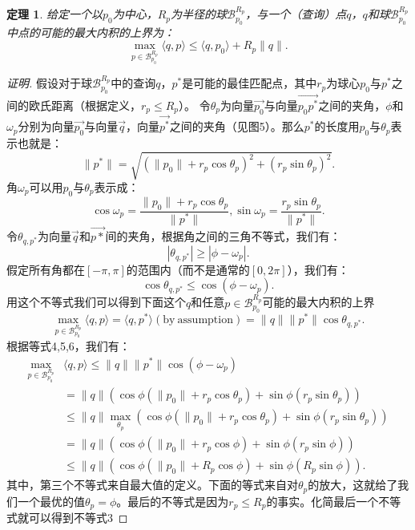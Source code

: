 \documentclass[twocolumn]{article}
\begin{document}
\newtheorem{theorem1}{定理}[section]
\begin{theorem1}
给定一个以$p_0$为中心，$R_p$为半径的球$\mathcal{B}_{p_0}^{R_p}$，与一个（查询）点$q$，$q$和球$\mathcal{B}_{p_0}^{R_p}$中点的可能的最大内积的上界为：
\begin{equation}
\max_{p \in \mathcal{B}_{p_0}^{R_p}} \langle q,p \rangle \le \langle q,p_0 \rangle + R_p \|q\|.
\end{equation}

\end{theorem1}
\begin{proof}[证明]
假设对于球$\mathcal{B}_{p_0}^{R_p}$中的查询$q$，$p^*$是可能的最佳匹配点，其中$r_p$为球心$p_0$与$p^*$之间的欧氏距离（根据定义，$r_p \le R_p$）。
令$\theta_p$为向量$\vec{p_0}$与向量$\vec{p_0 p^*}$之间的夹角，$\phi$和$\omega_p$分别为向量$\vec{p_0}$与向量$\vec{q}$，向量$\vec{p^*}$之间的夹角（见图5）。那么$p^*$的长度用$p_0$与$\theta_p$表示也就是：
\begin{equation}
\|p^*\| = \sqrt{(\|p_0\| + r_p\cos\theta_p)^2+(r_p\sin\theta_p)^2}.
\end{equation}
角$\omega_p$可以用$p_0$与$\theta_p$表示成：
\begin{equation}
\cos\omega_p = \frac{\|p_0\|+r_p\cos\theta_p}{\|p^*\|},
\sin\omega_p = \frac{r_p\sin\theta_p}{\|p^*\|}.
\end{equation}
令$\theta_{q,p^*}$为向量$\vec{q}$和$\vec{p*}$间的夹角，根据角之间的三角不等式，我们有：
\begin{equation*}
|\theta_{q,p^*}| \ge |\phi - \omega_p|.
\end{equation*}
假定所有角都在$[-\pi, \pi]$的范围内（而不是通常的$[0, 2\pi]$），我们有：
\begin{equation}
\cos\theta_{q,p^*} \le \cos(\phi - \omega_p).
\end{equation}
用这个不等式我们可以得到下面这个$q$和任意$p \in \mathcal{B}_{p_0}^{R_p}$可能的最大内积的上界
\begin{equation*}
\max_{p \in \mathcal{B}_{p_0}^{R_p}}\langle q,p \rangle = \langle q,p^* \rangle(\mathrm{by\ assumption}) = \|q\|\|p^*\|\cos\theta_{q,p^*}.
\end{equation*}
根据等式4,5,6，我们有：
\begin{align*}
\max_{p \in \mathcal{B}_{p_0}^{R_p}}&\langle q,p \rangle \le \|q\|\|p^*\|\cos(\phi-\omega_p) \\
 &= \|q\|(\cos\phi(\|p_0\|+r_p\cos\theta_p)+\sin\phi(r_p\sin\theta_p))                       \\
 &\le\|q\|\max_{\theta_p}(\cos\phi(\|p_0\| + r_p\cos\theta_p)+\sin\phi(r_p\sin\theta_p))     \\
 &= \|q\|(\cos\phi(\|p_0\|+r_p\cos\phi)+\sin\phi(r_p\sin\phi))                               \\
 &\le \|q\|(\cos\phi(\|p_0\|+R_p\cos\phi)+\sin\phi(R_p\sin\phi)).
\end{align*}
其中，第三个不等式来自最大值的定义。下面的等式来自对$\theta_p$的放大，这就给了我们一个最优的值$\theta_p = \phi$。最后的不等式是因为$r_p \le R_p$的事实。化简最后一个不等式就可以得到不等式3
\end{proof}
\end{document}
